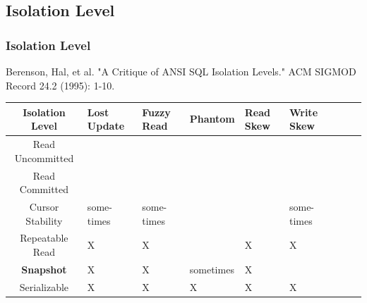 \documentclass{beamer}
\begin{document}
\subsection{Isolation Level}
\begin{frame}
	\frametitle{Isolation Level}
	Berenson, Hal, et al. "A Critique of ANSI SQL Isolation Levels." ACM SIGMOD Record 24.2 (1995): 1-10.
\begin{table}[h]
	\centering
	\begin{tabular}{|c|p{1cm}|p{1cm}|p{1.5cm}|p{1cm}|p{1cm}|p{2cm}|p{1cm}|p{1cm}|}
		\hline
		\textbf{Isolation Level} &  \textbf{Lost Update} & \textbf{Fuzzy Read} & \textbf{Phantom} & \textbf{Read Skew} & \textbf{Write Skew} \\ \hline
		Read Uncommitted         &  \checkmark           & \checkmark          & \checkmark       & \checkmark         & \checkmark          \\ \hline
		Read Committed           &  \checkmark           & \checkmark          & \checkmark       & \checkmark         & \checkmark          \\ \hline
		Cursor Stability         &  some- times            & some- times           & \checkmark       & \checkmark         & some- times           \\ \hline
		Repeatable Read          & X                    & X                   & \checkmark       & X                  & X                   \\ \hline
		\textbf{Snapshot}                 & X                    & X                   & sometimes        & X                  & \checkmark          \\ \hline
		Serializable             & X                    & X                   & X                & X                  & X                   \\ \hline
	\end{tabular}
\end{table}
\end{frame}
\end{document}

